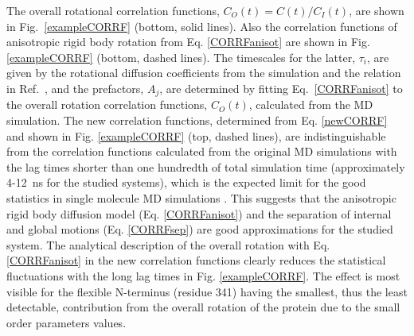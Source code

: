 \documentclass[pre,aps,floatfix,authordate1-4,twocolumn]{revtex4-1}
\begin{document}
The overall rotational correlation functions, $C_O(t)=C(t)/C_I(t)$,
are shown in Fig.~\ref{exampleCORRF} (bottom, solid lines).
Also the correlation functions of anisotropic rigid body rotation
from Eq. \ref{CORRFanisot} are shown in Fig. \ref{exampleCORRF} (bottom, dashed lines).
The timescales for the latter, $\tau_i$, are given by the rotational
diffusion coefficients from the simulation and the relation
in Ref.~, and the prefactors, $A_j$, are determined by fitting
Eq.~\ref{CORRFanisot} to the overall rotation correlation functions, $C_O(t)$, calculated from the MD simulation.
The new correlation functions, determined from Eq. \ref{newCORRF} and
shown in Fig. \ref{exampleCORRF} (top, dashed lines),
are indistinguishable from the correlation functions calculated from
the original MD simulations with the lag times shorter than one
hundredth of total simulation time (approximately 4-12~ns for the studied systems),
which is the expected limit for the good statistics in single molecule MD simulations \cite{lu06}.
This suggests that the anisotropic rigid body diffusion model (Eq. \ref{CORRFanisot}) and
the separation of internal and global motions (Eq. \ref{CORRFsep}) are
good approximations for the studied system.
The analytical description of the overall rotation with Eq. \ref{CORRFanisot}
in the new correlation functions
clearly reduces the statistical fluctuations with the long lag times in Fig. \ref{exampleCORRF}.
The effect is most visible for the flexible N-terminus (residue 341) having
the smallest, thus the least detectable, contribution from the
overall rotation of the protein due to the small order parameters values.


\end{document}
